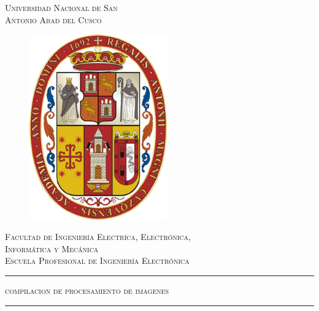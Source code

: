 \begin{titlepage}
   \begin{center}
     \huge{\textsc{Universidad Nacional de San \\[0.2cm] Antonio Abad del Cusco}}\\
     \vspace{1cm}
     
      \begin{figure}[h]
      \centering
      \includegraphics[width=5 cm, height=8cm]{UNSAAC.png}
      \end{figure}
      
      \vspace{3mm}
      
     \large{\textsc{Facultad de Ingeniería Electríca, Electrónica, \\[0.5mm]Informática y Mecánica }}   \\
     \vspace{1mm}
     \textsc{\large {Escuela Profesional de Ingeniería Electrónica}}
     \vspace{6mm}

    
    \rule{\linewidth}{0.7 mm}
      \begin{spacing}{1}
        \LARGE{\textsc{compilacion de procesamiento de imagenes}}
      \end{spacing}
    \rule{\linewidth}{0.7 mm}\\
    \vspace{2mm}
     

\end{center}
\end{titlepage}
